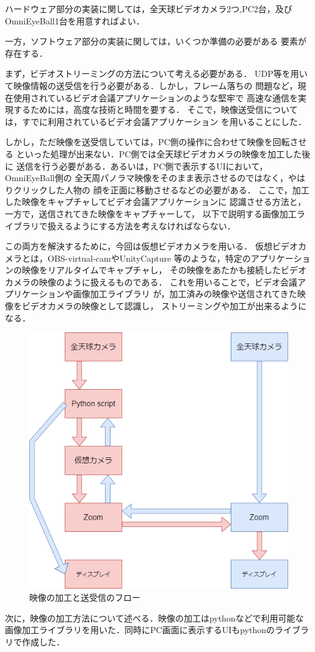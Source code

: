 ハードウェア部分の実装に関しては，全天球ビデオカメラ2つ,PC2台，及び
OmniEyeBall1台を用意すればよい．

一方，ソフトウェア部分の実装に関しては，いくつか準備の必要がある
要素が存在する．

まず，ビデオストリーミングの方法について考える必要がある．
UDP等を用いて映像情報の送受信を行う必要がある．しかし，フレーム落ちの
問題など，現在使用されているビデオ会議アプリケーションのような堅牢で
高速な通信を実現するためには，高度な技術と時間を要する．
そこで，映像送受信については，すでに利用されているビデオ会議アプリケーション
を用いることにした．

しかし，ただ映像を送受信していては，PC側の操作に合わせて映像を回転させる
といった処理が出来ない．PC側では全天球ビデオカメラの映像を加工した後に
送信を行う必要がある．あるいは，PC側で表示するUIにおいて，OmniEyeBall側の
全天周パノラマ映像をそのまま表示させるのではなく，やはりクリックした人物の
顔を正面に移動させるなどの必要がある．
ここで，加工した映像をキャプチャしてビデオ会議アプリケーションに
認識させる方法と，一方で，送信されてきた映像をキャプチャーして，
以下で説明する画像加工ライブラリで扱えるようにする方法を考えなければならない．

この両方を解決するために，今回は仮想ビデオカメラを用いる．
仮想ビデオカメラとは，OBS-virtual-cam\cite{7}やUnityCapture\cite{8}
等のような，特定のアプリケーションの映像をリアルタイムでキャプチャし，
その映像をあたかも接続したビデオカメラの映像のように扱えるものである．
これを用いることで，ビデオ会議アプリケーションや画像加工ライブラリ
が，加工済みの映像や送信されてきた映像をビデオカメラの映像として認識し，
ストリーミングや加工が出来るようになる．

\begin{figure}[tp]
  \centering
  \includegraphics[scale=0.7]{fig/flow.png}
  \caption{映像の加工と送受信のフロー}
\end{figure}

次に，映像の加工方法について述べる．映像の加工はpythonなどで利用可能な
画像加工ライブラリを用いた．同時にPC画面に表示するUIもpythonのライブラリで作成した．

